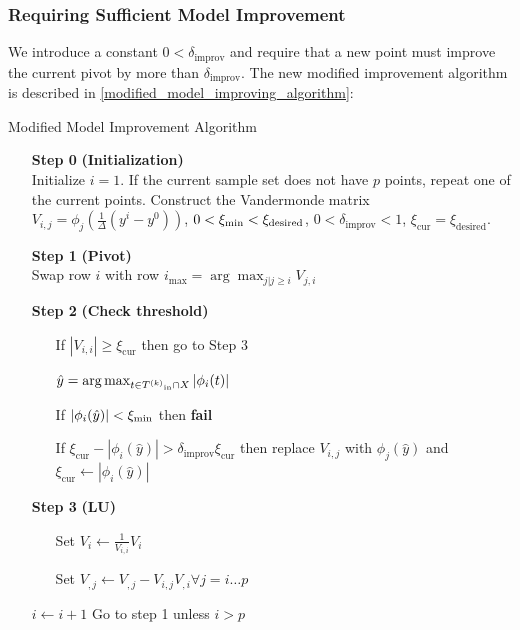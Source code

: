 \subsubsection{Requiring Sufficient Model Improvement}

We introduce a constant $0<\delta_{\text{improv}}$ and require that a new point must improve the current pivot by more than $\delta_{\text{improv}}$.
The new modified improvement algorithm is described in \cref{modified_model_improving_algorithm}:


\begin{algorithm}[H]
    \caption{Modified Model Improvement Algorithm}
    \label{modified_model_improving_algorithm}
    \begin{itemize}
        \item[\textbf{Step 0}] \textbf{(Initialization)} \\
            Initialize $i=1$.
            If the current sample set does not have $p$ points, repeat one of the current points. 
            Construct the Vandermonde matrix $V_{i,j} = \phi_j(\frac 1 {\Delta}(y^i - y^0))$,
            $0 < \xi_{\text{min}} < \xi_{\text{desired}}$, $0 <\delta_{\text{improv}} < 1$,
            $  \xi_{\text{cur}} = \xi_{\text{desired}}$.
            
        \item[\textbf{Step 1}] \textbf{(Pivot)} \\
            Swap row $i$ with row $i_{\max} = \arg \max_{j|j\ge i} V_{j,i} $
        
        \item[\textbf{Step 2}] \textbf{(Check threshold)} \begin{itemize}
                \item[] If $|V_{i,i}| \ge \xi_{\text{cur}} $ then go to Step 3
                \item[] $ \hat y = \arg\max_{t \in {T^{(k)}}_{\text{in}} \cap X} |\phi_i(t)|$
                \item[] If $\label{impossibly_poised} |\phi_i(\hat y)| < \xi_{\text{min}}$ then \textbf{fail}
                \item[] If $\xi_{\text{cur}} - |\phi_i(\hat y)| > \delta_{\text{improv}} \xi_{\text{cur}}$ then replace $V_{i,j}$ with $\phi_j(\hat y)$ and $\xi_{\text{cur}} \gets |\phi_i(\hat y)|$
            \end{itemize}
        
        \item[\textbf{Step 3}] \textbf{(LU)} \begin{itemize}
                \item[] Set $V_i \gets \frac{1}{V_{i,i}} V_i$
                \item[] Set $V_{,j} \gets V_{, j} - V_{i,j} V_{, i} \forall j=i \ldots p$
            \end{itemize}
            $i \gets i+1$
            Go to step 1 unless $i > p$
    \end{itemize}
\end{algorithm}

